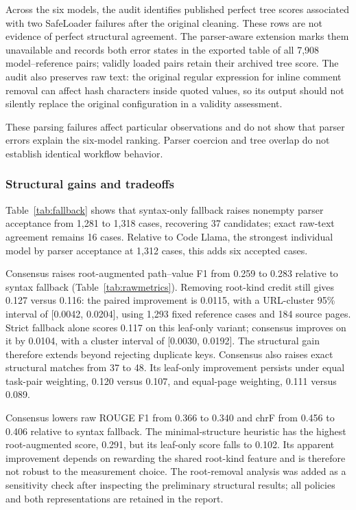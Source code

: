 Across the six models, the audit identifies \FalsePerfectCount{} published perfect tree scores associated with two SafeLoader failures after the original cleaning. These rows are not evidence of perfect structural agreement. The parser-aware extension marks them unavailable and records both error states in the exported table of all 7,908 model--reference pairs; validly loaded pairs retain their archived tree score. The audit also preserves raw text: the original regular expression for inline comment removal can affect hash characters inside quoted values, so its output should not silently replace the original configuration in a validity assessment.

These parsing failures affect particular observations and do not show that parser errors explain the six-model ranking. Parser coercion and tree overlap do not establish identical workflow behavior.

\subsubsection{Structural gains and tradeoffs}
Table~\ref{tab:fallback} shows that syntax-only fallback raises nonempty parser acceptance from 1,281 to 1,318 cases, recovering 37 candidates; exact raw-text agreement remains 16 cases. Relative to Code Llama, the strongest individual model by parser acceptance at 1,312 cases, this adds six accepted cases.



Consensus raises root-augmented path--value F1 from 0.259 to 0.283 relative to syntax fallback (Table~\ref{tab:rawmetrics}). Removing root-kind credit still gives 0.127 versus 0.116: the paired improvement is 0.0115, with a URL-cluster 95\% interval of [0.0042, 0.0204], using 1,293 fixed reference cases and 184 source pages. Strict fallback alone scores 0.117 on this leaf-only variant; consensus improves on it by 0.0104, with a cluster interval of [0.0030, 0.0192]. The structural gain therefore extends beyond rejecting duplicate keys. Consensus also raises exact structural matches from 37 to 48. Its leaf-only improvement persists under equal task-pair weighting, 0.120 versus 0.107, and equal-page weighting, 0.111 versus 0.089.

Consensus lowers raw ROUGE F1 from 0.366 to 0.340 and chrF from 0.456 to 0.406 relative to syntax fallback. The minimal-structure heuristic has the highest root-augmented score, 0.291, but its leaf-only score falls to 0.102. Its apparent improvement depends on rewarding the shared root-kind feature and is therefore not robust to the measurement choice. The root-removal analysis was added as a sensitivity check after inspecting the preliminary structural results; all policies and both representations are retained in the report.

